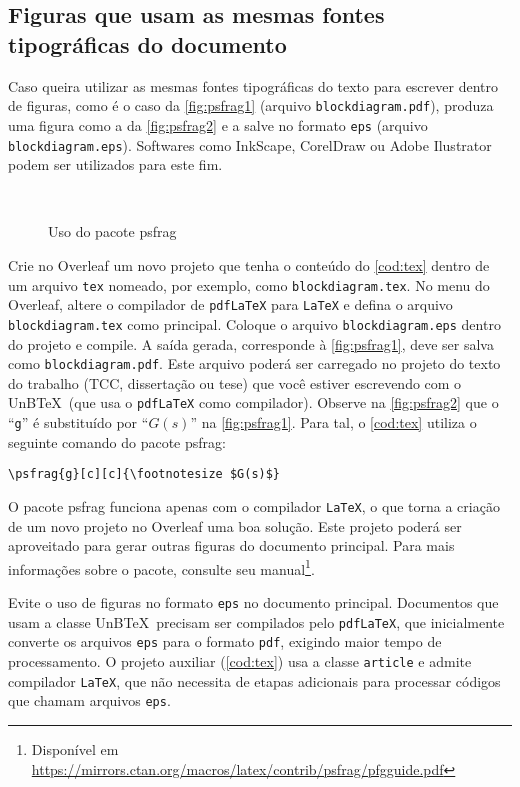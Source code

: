 \subsection{Figuras que usam as mesmas fontes tipográficas do documento}

Caso queira utilizar as mesmas fontes tipográficas do texto para escrever dentro de figuras, como é o caso da \cref{fig:psfrag1} (arquivo \texttt{blockdiagram.pdf}), produza uma figura como a da \cref{fig:psfrag2} e a salve no formato \texttt{eps} (arquivo \texttt{blockdiagram.eps}). Softwares como InkScape, CorelDraw ou Adobe Ilustrator podem ser utilizados para este fim.

\begin{figure}[htb]
    \centering
    \caption{Uso do pacote \textsf{psfrag}}\label{fig:psgrag}
     \\
\end{figure}

Crie no Overleaf um novo projeto que tenha o conteúdo do \cref{cod:tex} dentro de um arquivo \texttt{tex} nomeado, por exemplo, como \texttt{blockdiagram.tex}. No menu do Overleaf, altere o compilador de \texttt{pdfLaTeX} para \texttt{LaTeX} e defina o arquivo \texttt{blockdiagram.tex} como principal. Coloque o arquivo \texttt{blockdiagram.eps} dentro do projeto e compile. A saída gerada, corresponde à \cref{fig:psfrag1}, deve ser salva como \texttt{blockdiagram.pdf}. Este arquivo poderá ser carregado no projeto do texto do trabalho (TCC, dissertação ou tese) que você estiver escrevendo com o UnB\TeX\ (que usa o \texttt{pdfLaTeX} como compilador). Observe na \cref{fig:psfrag2} que o ``\texttt{g}'' é substituído por ``$G(s)$'' na \cref{fig:psfrag1}. Para tal, o \cref{cod:tex} utiliza o seguinte comando do pacote \textsf{psfrag}:
\begin{verbatim}
\psfrag{g}[c][c]{\footnotesize $G(s)$}
\end{verbatim}



O pacote \textsf{psfrag} funciona apenas com o compilador \texttt{LaTeX}, o que torna a criação de um novo projeto no Overleaf uma boa solução. Este projeto poderá ser aproveitado para gerar outras figuras do documento principal. Para mais informações sobre o pacote, consulte seu manual\footnote{Disponível em \url{https://mirrors.ctan.org/macros/latex/contrib/psfrag/pfgguide.pdf}}.

Evite o uso de figuras no formato \texttt{eps} no documento principal. Documentos que usam a classe UnB\TeX\ precisam ser compilados pelo \texttt{pdfLaTeX}, que inicialmente converte os arquivos \texttt{eps} para o formato \texttt{pdf}, exigindo maior tempo de processamento. O projeto auxiliar (\cref{cod:tex}) usa a classe \texttt{article} e admite compilador \texttt{LaTeX}, que não necessita de etapas adicionais para processar códigos que chamam arquivos \texttt{eps}.